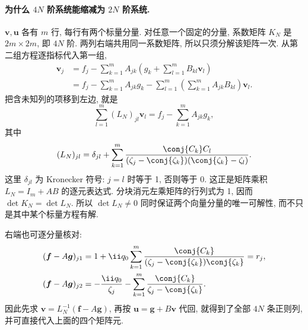 \paragraph{为什么 $4N$ 阶系统能缩减为 $2N$ 阶系统.}
$\boldsymbol v,\boldsymbol u$ 各有 $m$ 行, 每行有两个标量分量.
对任意一个固定的分量, 系数矩阵 $K_N$ 是 $2m\times2m$, 即 $4N$ 阶.
两列右端共用同一系数矩阵, 所以只须分解该矩阵一次.
从第二组方程逐指标代入第一组,
\[
\begin{aligned}
\mathbf v_j
&=f_j-\sum\limits_{k=1}^{m}A_{jk}
\left(g_k+\sum\limits_{l=1}^{m}B_{kl}\mathbf v_l\right)\\
&=f_j-\sum\limits_{k=1}^{m}A_{jk}g_k
-\sum\limits_{l=1}^{m}\left(\sum\limits_{k=1}^{m}A_{jk}B_{kl}\right)\mathbf v_l.
\end{aligned}
\]
把含未知列的项移到左边, 就是
\[
\sum\limits_{l=1}^{m}(L_N)_{jl}\mathbf v_l
=f_j-\sum\limits_{k=1}^{m}A_{jk}g_k,
\]
其中
\[
(L_N)_{jl}=\delta_{jl}+
\sum\limits_{k=1}^{m}
\dfrac{\conj{C_k}C_l}
{(\zeta_j-\conj{\zeta_k})(\conj{\zeta_k}-\zeta_l)}.
\]
这里 $\delta_{jl}$ 为 Kronecker 符号: $j=l$ 时等于 1, 否则等于 0.
这正是矩阵乘积 $L_N=I_m+AB$ 的逐元表达式.
分块消元左乘矩阵的行列式为 1, 因而
$\det K_N=\det L_N$.
所以 $\det L_N\ne0$ 同时保证两个向量分量的唯一可解性,
而不只是其中某个标量方程有解.

右端也可逐分量核对:
\[
\begin{aligned}
(\boldsymbol f-A\boldsymbol g)_{j1}
&=1+\ii q_0\sum\limits_{k=1}^{m}
\dfrac{\conj{C_k}}{(\zeta_j-\conj{\zeta_k})\conj{\zeta_k}}=r_j,\\
(\boldsymbol f-A\boldsymbol g)_{j2}
&=-\dfrac{\ii q_0}{\zeta_j}
-\sum\limits_{k=1}^{m}\dfrac{\conj{C_k}}{\zeta_j-\conj{\zeta_k}}.
\end{aligned}
\]
因此先求 $\boldsymbol v=L_N^{-1}(\boldsymbol f-A\boldsymbol g)$,
再按 $\boldsymbol u=\boldsymbol g+B\boldsymbol v$ 代回,
就得到了全部 $4N$ 条正则列, 并可直接代入上面的四个矩阵元.

